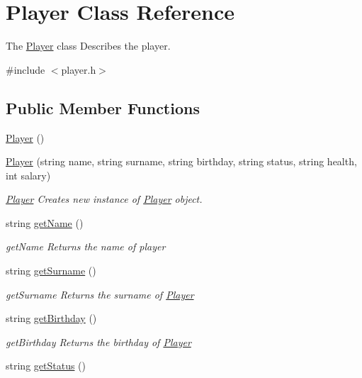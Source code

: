 \hypertarget{class_player}{\section{Player Class Reference}
\label{class_player}
}


The \hyperlink{class_player}{Player} class Describes the player.  




{\ttfamily \#include $<$player.\-h$>$}

\subsection*{Public Member Functions}
\begin{DoxyCompactItemize}
\item 
\hyperlink{class_player_affe0cc3cb714f6deb4e62f0c0d3f1fd8}{Player} ()
\item 
\hyperlink{class_player_aee48abd7fb6209cb806608881770b7f8}{Player} (string name, string surname, string birthday, string status, string health, int salary)
\begin{DoxyCompactList}\small\item\em \hyperlink{class_player}{Player} Creates new instance of \hyperlink{class_player}{Player} object. \end{DoxyCompactList}\item 
string \hyperlink{class_player_af9a6045fa96f736664c4eab4caa5e8e5}{get\-Name} ()
\begin{DoxyCompactList}\small\item\em get\-Name Returns the name of player \end{DoxyCompactList}\item 
string \hyperlink{class_player_a00efbc816b6584e40040cb2ba8388b0b}{get\-Surname} ()
\begin{DoxyCompactList}\small\item\em get\-Surname Returns the surname of \hyperlink{class_player}{Player} \end{DoxyCompactList}\item 
string \hyperlink{class_player_ae3a352e2609c68d5edb8d73ef9e8392f}{get\-Birthday} ()
\begin{DoxyCompactList}\small\item\em get\-Birthday Returns the birthday of \hyperlink{class_player}{Player} \end{DoxyCompactList}\item 
string \hyperlink{class_player_a1226da7129b2cd61c5529d630cf38df8}{get\-Status} ()

\end{DoxyCompactItemize}
